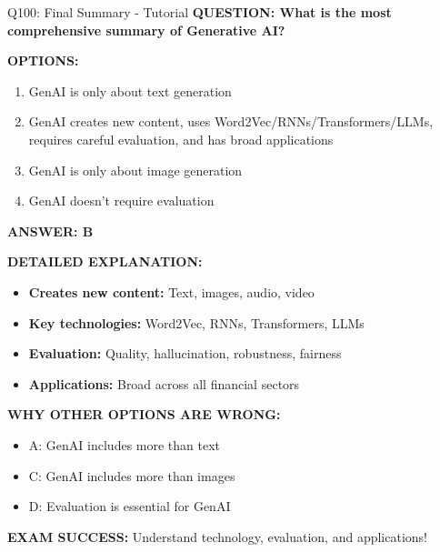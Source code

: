 \documentclass[8pt]{beamer}
\begin{document}
	\begin{frame}{Q100: Final Summary - Tutorial}
		\fontsize{6.5}{7.5}\selectfont
		\textbf{QUESTION: What is the most comprehensive summary of Generative AI?}
		
		\vspace{0.1cm}
		\textbf{OPTIONS:}
		\begin{enumerate}
			\item GenAI is only about text generation
			\item GenAI creates new content, uses Word2Vec/RNNs/Transformers/LLMs, requires careful evaluation, and has broad applications
			\item GenAI is only about image generation
			\item GenAI doesn't require evaluation
		\end{enumerate}
		
		\vspace{0.1cm}
		\textcolor{myblue}{\textbf{ANSWER: B}}
		
		\vspace{0.1cm}
		\textbf{DETAILED EXPLANATION:}
		\begin{itemize}
			\item \textbf{Creates new content:} Text, images, audio, video
			\item \textbf{Key technologies:} Word2Vec, RNNs, Transformers, LLMs
			\item \textbf{Evaluation:} Quality, hallucination, robustness, fairness
			\item \textbf{Applications:} Broad across all financial sectors
		\end{itemize}
		
		\vspace{0.1cm}
		\textcolor{myred}{\textbf{WHY OTHER OPTIONS ARE WRONG:}}
		\begin{itemize}
			\item \textcolor{myred}{A:} GenAI includes more than text
			\item \textcolor{myred}{C:} GenAI includes more than images
			\item \textcolor{myred}{D:} Evaluation is essential for GenAI
		\end{itemize}
		
		\textcolor{myred}{\textbf{EXAM SUCCESS:}} Understand \textcolor{myblue}{technology, evaluation, and applications}!
	\end{frame}
	
\end{document}
